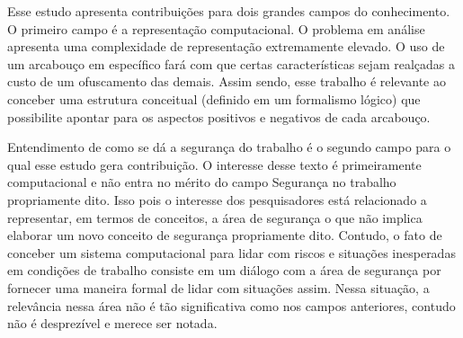 Esse estudo apresenta contribuições para dois grandes campos do conhecimento. O primeiro campo é a representação computacional. O problema em análise apresenta uma complexidade de representação extremamente elevado. O uso de um arcabouço em específico fará com que certas características sejam realçadas a custo de um ofuscamento das demais. Assim sendo, esse trabalho é relevante ao conceber uma estrutura conceitual (definido em um formalismo lógico) que possibilite apontar para os aspectos positivos e negativos de cada arcabouço. 

Entendimento de como se dá a segurança do trabalho é o segundo campo para o qual esse estudo gera contribuição. O interesse desse texto é primeiramente computacional e não entra no mérito do campo Segurança no trabalho propriamente dito. Isso pois o interesse dos pesquisadores está relacionado a representar, em termos de conceitos, a área de segurança o que não implica elaborar um novo conceito de segurança propriamente dito. Contudo, o fato de conceber um sistema computacional para lidar com riscos e situações inesperadas em condições de trabalho consiste em um diálogo com a área de segurança por fornecer uma maneira formal de lidar com situações assim. Nessa situação, a relevância nessa área não é tão significativa como nos campos anteriores, contudo não é desprezível e merece ser notada.